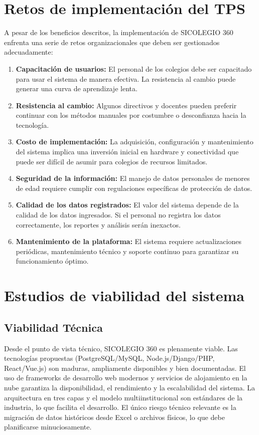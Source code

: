 \documentclass[12pt,a4paper,oneside]{report}
\begin{document}
\section{Retos de implementación del TPS}
A pesar de los beneficios descritos, la implementación de SICOLEGIO 360 enfrenta una serie de retos organizacionales que deben ser gestionados adecuadamente:
\begin{enumerate}
  \item \textbf{Capacitación de usuarios:} El personal de los colegios debe ser capacitado para usar el sistema de manera efectiva. La resistencia al cambio puede generar una curva de aprendizaje lenta.
  \item \textbf{Resistencia al cambio:} Algunos directivos y docentes pueden preferir continuar con los métodos manuales por costumbre o desconfianza hacia la tecnología.
  \item \textbf{Costo de implementación:} La adquisición, configuración y mantenimiento del sistema implica una inversión inicial en hardware y conectividad que puede ser difícil de asumir para colegios de recursos limitados.
  \item \textbf{Seguridad de la información:} El manejo de datos personales de menores de edad requiere cumplir con regulaciones específicas de protección de datos.
  \item \textbf{Calidad de los datos registrados:} El valor del sistema depende de la calidad de los datos ingresados. Si el personal no registra los datos correctamente, los reportes y análisis serán inexactos.
  \item \textbf{Mantenimiento de la plataforma:} El sistema requiere actualizaciones periódicas, mantenimiento técnico y soporte continuo para garantizar su funcionamiento óptimo.
\end{enumerate}

\section{Estudios de viabilidad del sistema}

\subsection{Viabilidad Técnica}
Desde el punto de vista técnico, SICOLEGIO 360 es plenamente viable. Las tecnologías propuestas (PostgreSQL/MySQL, Node.js/Django/PHP, React/Vue.js) son maduras, ampliamente disponibles y bien documentadas. El uso de frameworks de desarrollo web modernos y servicios de alojamiento en la nube garantiza la disponibilidad, el rendimiento y la escalabilidad del sistema. La arquitectura en tres capas y el modelo multiinstitucional son estándares de la industria, lo que facilita el desarrollo. El único riesgo técnico relevante es la migración de datos históricos desde Excel o archivos físicos, lo que debe planificarse minuciosamente.
\end{document}
